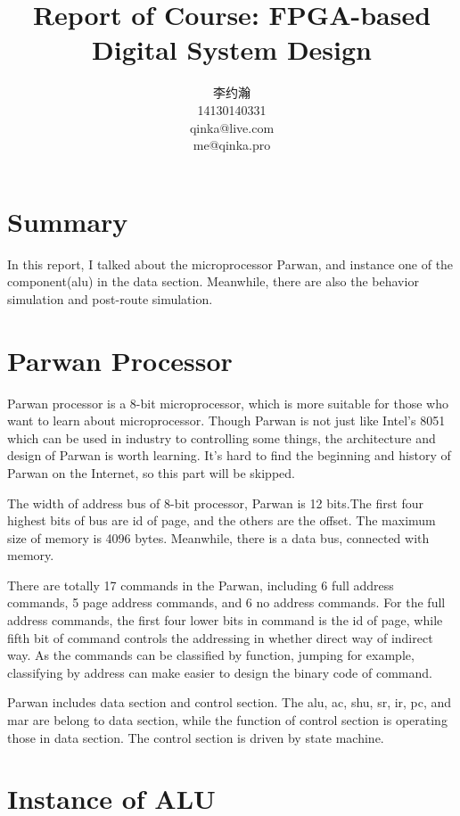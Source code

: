 \documentclass{article}
\title{Report of Course: FPGA-based Digital System Design}
\author{李约瀚 \\ 14130140331 \\ qinka@live.com \\ me@qinka.pro}
\begin{document}
\maketitle
\newpage
\tableofcontents
\newpage

\section{Summary}
\label{sec:summary}

In this report, I talked about the microprocessor Parwan,
and instance one of the component(alu) in the data section.
Meanwhile, there are also the behavior simulation and post-route simulation.


\section{Parwan Processor}
\label{sec:parwan}

Parwan processor is a 8-bit microprocessor, which is more suitable for those who want to learn about microprocessor.
Though Parwan is not just like Intel's 8051 which can be used in industry to controlling some things,
the architecture and design of Parwan is worth learning. 
It's hard to find the beginning and history of Parwan on the Internet, so this part will be skipped.

The width of address bus of 8-bit processor, Parwan is 12 bits.The first four highest bits of bus are id of page,
and the others are the offset. The maximum size of memory is 4096 bytes. Meanwhile, there is a data bus, connected with memory.

There are totally 17 commands in the Parwan, including 6 full address commands, 5 page address commands, and 6 no address commands.
For the full address commands, the first four lower bits in command is the id of page, while fifth bit of command controls
the addressing in whether direct way of indirect way. As the commands can be classified by function, jumping for example,
classifying by address can make easier to design the binary code of command.

Parwan includes data section and control section. The alu, ac, shu, sr, ir, pc, and mar are belong to data section,
while the function of control section is operating those in data section.
The control section is driven by state machine.

\section{Instance of ALU}
\label{sec:alu}
\end{document}
